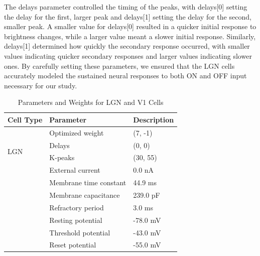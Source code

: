 \documentclass[12pt]{article}
\begin{document}
The delays parameter controlled the timing of the peaks, with delays[0] setting the delay for the first, larger peak and delays[1] setting the delay for the second, smaller peak. A smaller value for delays[0] resulted in a quicker initial response to brightness changes, while a larger value meant a slower initial response. Similarly, delays[1] determined how quickly the secondary response occurred, with smaller values indicating quicker secondary responses and larger values indicating slower ones. By carefully setting these parameters, we ensured that the LGN cells accurately modeled the sustained neural responses to both ON and OFF input necessary for our study.

\begin{table}[H]
  \centering
  \caption{Parameters and Weights for LGN and V1 Cells}
  \begin{tabular}{lll}
  \toprule
  \textbf{Cell Type} & \textbf{Parameter} & \textbf{Description} \\
  \midrule
  \multirow{4}{*}{LGN} 
      & Optimized weight      & (7, -1) \\
      & Delays   & (0, 0) \\
      & K-peaks   & (30, 55) \\
  \midrule
  \multirow{7}{*}{V1} 
      & External current         & 0.0 nA \\
      & Membrane time constant        & 44.9 ms \\
      & Membrane capacitance          & 239.0 pF \\
      & Refractory period       & 3.0 ms \\
      & Resting potential          & -78.0 mV \\
      & Threshold potential         & -43.0 mV \\
      & Reset potential      & -55.0 mV \\
  \bottomrule
  \end{tabular}
\end{table}
\end{document}
